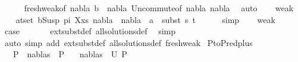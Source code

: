\begin{isabellebody}
\ \ \ \ \isamarkupfalse%
\ fresh{\isacharunderscore}{\kern0pt}weak{\isacharbrackleft}{\kern0pt}of\ nabla{}\ b\ {\isacharunderscore}{\kern0pt}\ nabla{}{\isacharbrackright}{\kern0pt}\ Un{\isacharunderscore}{\kern0pt}commute{\isacharbrackleft}{\kern0pt}of\ nabla{}\ nabla{}{\isacharbrackright}{\kern0pt}\ \isamarkupfalse%
\ auto\isanewline
\ \ \isamarkupfalse%
\ weak{}{\isacharparenleft}{\kern0pt}{}{\isacharparenright}{\kern0pt}\ \isanewline
\ \ \isamarkupfalse%
\ {\isachardoublequoteopen}{\isasymforall}{\isacharparenleft}{\kern0pt}a{\isacharcomma}{\kern0pt}t{\isacharparenright}{\kern0pt}{\isasymin}set\ {\isacharparenleft}{\kern0pt}{\isacharparenleft}{\kern0pt}b{\isacharcomma}{\kern0pt}Susp\ pi\ X{\isacharparenright}{\kern0pt}{\isacharhash}{\kern0pt}xs{\isacharparenright}{\kern0pt}{\isachardot}{\kern0pt}\ {\isacharparenleft}{\kern0pt}nabla{}\ {\isasymunion}\ nabla{}{\isacharparenright}{\kern0pt}\ {\isasymturnstile}\ a\ {\isasymsharp}\ subst\ s{}\ t{\isachardoublequoteclose}\isanewline
\ \ \ \ \isamarkupfalse%
\ simp\isanewline
\ \ \isamarkupfalse%
\ weak{}\ \isamarkupfalse%
\ {\isacharquery}{\kern0pt}case\ \isanewline
\ \ \ \ \isamarkupfalse%
\ ext{\isacharunderscore}{\kern0pt}subst{\isacharunderscore}{\kern0pt}def\ all{\isacharunderscore}{\kern0pt}solutions{\isacharunderscore}{\kern0pt}def\ \isamarkupfalse%
\ simp\isanewline
{}\isamarkupfalse%
\ {\isacharparenleft}{\kern0pt}auto\ simp\ add{\isacharcolon}{\kern0pt}\ ext{\isacharunderscore}{\kern0pt}subst{\isacharunderscore}{\kern0pt}def\ all{\isacharunderscore}{\kern0pt}solutions{\isacharunderscore}{\kern0pt}def\ fresh{\isacharunderscore}{\kern0pt}weak{\isacharparenright}{\kern0pt}%
\endisatagproof
{\isafoldproof}%
%
\isadelimproof
\isanewline
%
\endisadelimproof
\isanewline
\isanewline
\isanewline
\isanewline
{}\isamarkupfalse%
\ P{}{\isacharunderscore}{\kern0pt}to{\isacharunderscore}{\kern0pt}P{}{\isacharunderscore}{\kern0pt}red{\isacharunderscore}{\kern0pt}plus{}{\isacharcolon}{\kern0pt}\ \isanewline
\ \ \ {\isachardoublequoteopen}P{}\ {\isasymTurnstile}\ {\isacharparenleft}{\kern0pt}nabla{\isacharcomma}{\kern0pt}s{\isacharparenright}{\kern0pt}\ {\isasymRightarrow}\ P{}{\isachardoublequoteclose}\isanewline
\ \ \ {\isachardoublequoteopen}{\isacharparenleft}{\kern0pt}nabla{}{\isacharcomma}{\kern0pt}s{}{\isacharparenright}{\kern0pt}\ {\isasymin}\ U\ P{}{\isachardoublequoteclose}\isanewline

\end{isabellebody}

